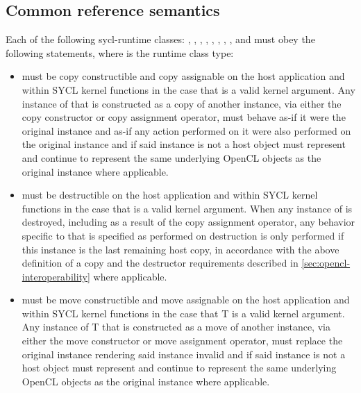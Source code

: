 \subsection{Common reference semantics}
\label{sec:reference-semantics}

Each of the following \gls{sycl-runtime} classes: , , , , , , , ,  and  must obey the following statements, where  is the runtime class type:

\begin{itemize}

\item {} must be copy constructible and copy assignable on the host application and within SYCL kernel functions in the case that  is a valid kernel argument. Any instance of  that is constructed as a copy of another instance, via either the copy constructor or copy assignment operator, must behave as-if it were the original instance and as-if any action performed on it were also performed on the original instance and if said instance is not a host object must represent and continue to represent the same underlying OpenCL objects as the original instance where applicable.

\item {} must be destructible on the host application and within SYCL kernel functions in the case that  is a valid kernel argument. When any instance of  is destroyed, including as a result of the copy assignment operator, any behavior specific to  that is specified as performed on destruction is only performed if this instance is the last remaining host copy, in accordance with the above definition of a copy and the destructor requirements described in \ref{sec:opencl-interoperability} where applicable.

\item {} must be move constructible and move assignable on the host application and within SYCL kernel functions in the case that T is a valid kernel argument. Any instance of T that is constructed as a move of another instance, via either the move constructor or move assignment operator, must replace the original instance rendering said instance invalid and if said instance is not a host object must represent and continue to represent the same underlying OpenCL objects as the original instance where applicable.


\end{itemize}
